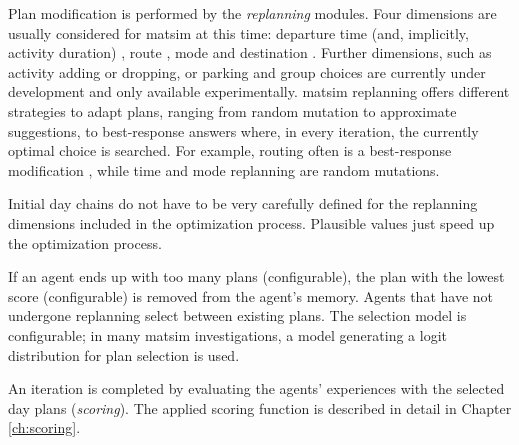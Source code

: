 Plan modification is performed by the \emph{replanning} modules. Four dimensions are usually considered for \gls{matsim} at this time: departure time (and, implicitly, activity duration) \citep[][]{BalmerRaneyEtAl2005act-times}, route \citep[]{LefebvreBalmer_unpub_STRC_2007}, mode \citep{GretherEtAl2009SimpleModeChoiceIPL} and destination \citep{HorniEtAl_TRR_2009,
HorniEtAl2011TrbLocationChoice%
}. 
Further dimensions, such as activity adding or dropping, or parking and group choices are currently under development and only available experimentally. %
\gls{matsim} replanning offers different strategies to adapt plans, ranging from random mutation to approximate suggestions, to best-response answers where, in every iteration, the currently optimal choice is searched. For example, routing
often is a best-response modification%
, while time and mode replanning are random mutations.

Initial day chains do not have to be very carefully defined for the replanning dimensions included in the optimization process. Plausible values just speed up the optimization process. 

If an agent ends up with too many plans (configurable), the plan with the lowest score (configurable) is removed from the agent's memory. Agents that have not undergone replanning select between existing plans. The selection model is configurable; in many \gls{matsim} investigations, a model generating a logit distribution for plan selection is used.

An iteration is completed by evaluating the agents' experiences with the selected day plans (\emph{scoring}). The applied scoring function is described in detail in Chapter \ref{ch:scoring}.

